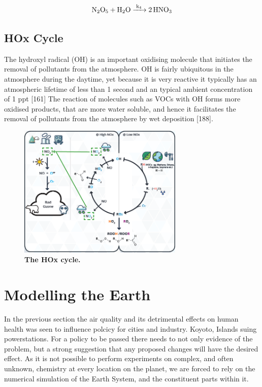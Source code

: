 \begin{equation}
  \ce{N2O5 + H2O ->[k4] 2HNO3}
  \label{eqn:hno3}
\end{equation}



\subsection{HOx Cycle}

The hydroxyl radical (OH) is an important oxidising molecule that initiates the removal of pollutants from the atmosphere. OH is fairly ubiquitous in the atmosphere during the daytime, yet because it is very reactive it typically has an atmospheric lifetime of less than 1 second and an typical ambient concentration of 1 ppt [161]
The reaction of molecules such as VOCs with OH forms more oxidised products, that are more water soluble, and hence it facilitates the removal of pollutants from the atmosphere by wet deposition [188].


\begin{figure}[H]
    \centering
    \includegraphics[width=0.7\textwidth]{hoxcycle.png}
    \caption{\textbf{The HOx cycle.}}
    \label{fig:hox}
\end{figure}



\section{Modelling the Earth}
In the previous section the air quality and its detrimental effects on human health was seen to influence polcicy for cities and industry. Koyoto, Islands suing powerstations.
For a policy to be passed there needs to not only evidence of the problem, but a strong suggestion that any proposed changes will have the desired effect. As it is not possible to perform experiments on complex, and often unknown, chemistry at every location on the planet, we are forced to rely on the numerical simulation of the Earth System, and the constituent parts within it.
